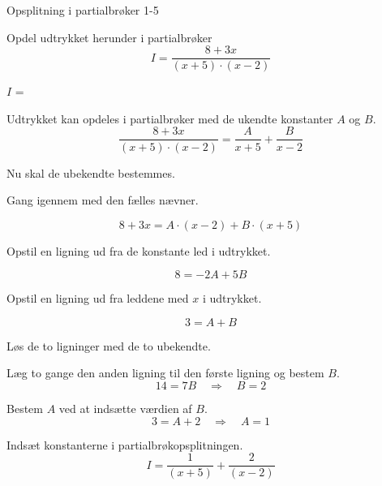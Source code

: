 \documentclass{article}
\begin{document}
\begin{exercise}{Opsplitning i partialbrøker 1-5}
	
	Opdel udtrykket herunder i partialbrøker
	\[
	I = \frac{8 + 3x}{(x + 5) \cdot (x - 2)}
	\]
	
	$I$ =  
	
	\hint
	Udtrykket kan opdeles i partialbrøker med de ukendte konstanter $A$ og $B$.
	\[
	\frac{8 + 3x}{(x + 5) \cdot (x - 2)} = 
	\frac{A}{x + 5} + \frac{B}{x - 2}
	\]
	
	\hint
	Nu skal de ubekendte bestemmes.
	
	\hint
	Gang igennem med den fælles nævner.
	
	\hint
	\[
	8 + 3x = A \cdot (x - 2) + B \cdot (x + 5)
	\]
	
	\hint
	Opstil en ligning ud fra de konstante led i udtrykket.
	
	\hint
	\[
	8 = -2A + 5B
	\]
	
	\hint
	Opstil en ligning ud fra leddene med $x$ i udtrykket.
	
	\hint
	\[
	3 = A + B
	\]
	
	\hint
	Løs de to ligninger med de to ubekendte.
	
	\hint
	Læg to gange den anden ligning til den første ligning og bestem $B$.
	\[
	14 = 7B \quad	\Rightarrow		\quad		B = 2
	\]
	
	\hint
	Bestem $A$ ved at indsætte værdien af $B$.
	\[
	3 =  A + 2 \quad 	\Rightarrow		\quad A = 1
	\]
	
	\hint
	Indsæt konstanterne i partialbrøkopsplitningen.
	\[
	I = \frac{1}{(x+5)} + \frac{2}{(x-2)}
	\]
	
	
	
\end{exercise}
\end{document}
